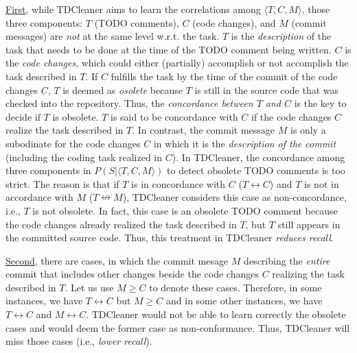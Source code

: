 \underline{First}, while TDCleaner aims to learn the correlations
among $\langle T, C, M \rangle$, those three components: $T$ (TODO
comments), $C$ (code changes), and $M$ (commit messages) are {\em not}
at the same level w.r.t. the task. $T$ is the {\em description} of the
task that needs to be done at the time of the TODO comment being
written. $C$ is the {\em code changes}, which could either (partially)
accomplish or not accomplish the task described in $T$. If $C$
fulfills the task by the time of the commit of the code changes $C$,
$T$ is deemed as {\em osolete} because $T$ is still in the source code
that was checked into the repository. Thus, the {\em concordance
  between $T$ and $C$} is the key to decide if $T$ is obsolete. $T$ is
said to be concordance with $C$ if the code changes $C$ realize the
task described in $T$. In contrast, the commit message $M$ is only a
subodinate for the code changes $C$ in which it is the {\em
  description of the commit} (including the coding task realized in
$C$). In TDCleaner, the concordance among three components in $P(S |
\langle T, C, M \rangle)$ to detect obsolete TODO comments is too
strict. The reason is that if $T$ is in concordance with $C$ ($T
\leftrightarrow C$) and $T$ is not in accordance with $M$ ($T
\nleftrightarrow M$), TDCleaner considers this case as
non-concordance, i.e., $T$ is not obsolete. In fact, this case is
an obsolete TODO comment because the code changes already realized the
task described in $T$, but $T$ still appears in the committed source
code. 
%
Thus, this treatment in TDCleaner {\em reduces recall}.

\underline{Second}, there are cases, in which the commit mesage $M$
describing the {\em entire} commit that includes other changes beside
the code changes $C$ realizing the task described in $T$. Let us use
$M \geq C$ to denote these cases. Therefore, in some instances, we
have $T \leftrightarrow C$ but $M \geq C$ and in some other instances,
we have $T \leftrightarrow C$ and $M \leftrightarrow C$. TDCleaner
would not be able to learn correctly the obsolete cases and would deem
the former case as non-conformance. Thus, TDCleaner will miss those
cases (i.e., {\em lower recall}).

